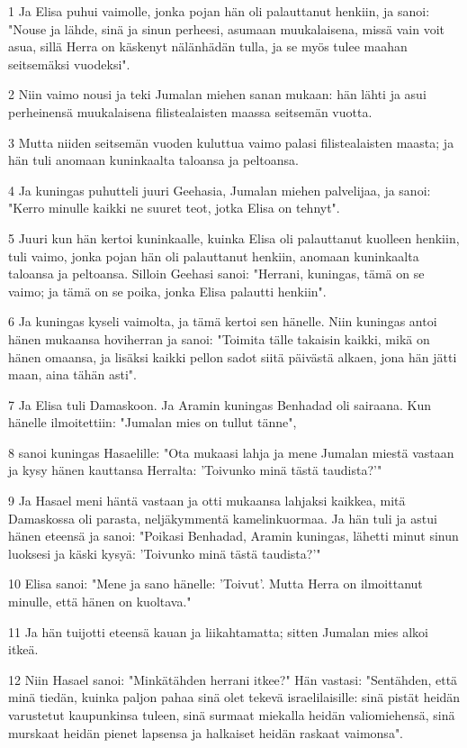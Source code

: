 \par 1 Ja Elisa puhui vaimolle, jonka pojan hän oli palauttanut henkiin, ja sanoi: "Nouse ja lähde, sinä ja sinun perheesi, asumaan muukalaisena, missä vain voit asua, sillä Herra on käskenyt nälänhädän tulla, ja se myös tulee maahan seitsemäksi vuodeksi".
\par 2 Niin vaimo nousi ja teki Jumalan miehen sanan mukaan: hän lähti ja asui perheinensä muukalaisena filistealaisten maassa seitsemän vuotta.
\par 3 Mutta niiden seitsemän vuoden kuluttua vaimo palasi filistealaisten maasta; ja hän tuli anomaan kuninkaalta taloansa ja peltoansa.
\par 4 Ja kuningas puhutteli juuri Geehasia, Jumalan miehen palvelijaa, ja sanoi: "Kerro minulle kaikki ne suuret teot, jotka Elisa on tehnyt".
\par 5 Juuri kun hän kertoi kuninkaalle, kuinka Elisa oli palauttanut kuolleen henkiin, tuli vaimo, jonka pojan hän oli palauttanut henkiin, anomaan kuninkaalta taloansa ja peltoansa. Silloin Geehasi sanoi: "Herrani, kuningas, tämä on se vaimo; ja tämä on se poika, jonka Elisa palautti henkiin".
\par 6 Ja kuningas kyseli vaimolta, ja tämä kertoi sen hänelle. Niin kuningas antoi hänen mukaansa hoviherran ja sanoi: "Toimita tälle takaisin kaikki, mikä on hänen omaansa, ja lisäksi kaikki pellon sadot siitä päivästä alkaen, jona hän jätti maan, aina tähän asti".
\par 7 Ja Elisa tuli Damaskoon. Ja Aramin kuningas Benhadad oli sairaana. Kun hänelle ilmoitettiin: "Jumalan mies on tullut tänne",
\par 8 sanoi kuningas Hasaelille: "Ota mukaasi lahja ja mene Jumalan miestä vastaan ja kysy hänen kauttansa Herralta: 'Toivunko minä tästä taudista?'"
\par 9 Ja Hasael meni häntä vastaan ja otti mukaansa lahjaksi kaikkea, mitä Damaskossa oli parasta, neljäkymmentä kamelinkuormaa. Ja hän tuli ja astui hänen eteensä ja sanoi: "Poikasi Benhadad, Aramin kuningas, lähetti minut sinun luoksesi ja käski kysyä: 'Toivunko minä tästä taudista?'"
\par 10 Elisa sanoi: "Mene ja sano hänelle: 'Toivut'. Mutta Herra on ilmoittanut minulle, että hänen on kuoltava."
\par 11 Ja hän tuijotti eteensä kauan ja liikahtamatta; sitten Jumalan mies alkoi itkeä.
\par 12 Niin Hasael sanoi: "Minkätähden herrani itkee?" Hän vastasi: "Sentähden, että minä tiedän, kuinka paljon pahaa sinä olet tekevä israelilaisille: sinä pistät heidän varustetut kaupunkinsa tuleen, sinä surmaat miekalla heidän valiomiehensä, sinä murskaat heidän pienet lapsensa ja halkaiset heidän raskaat vaimonsa".
